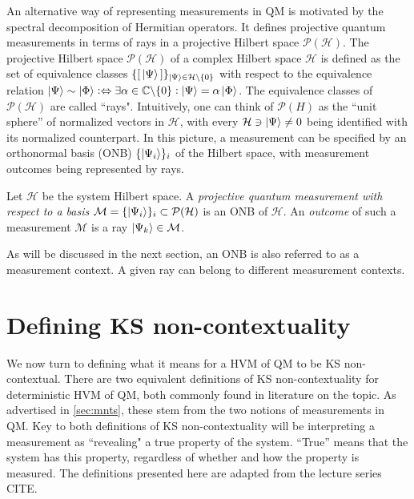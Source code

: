 An alternative way of representing measurements in QM is motivated by the spectral decomposition of Hermitian operators. It defines projective quantum measurements in terms of rays in a projective Hilbert space $\mathcal{P}(\mathcal{H})$. The projective Hilbert space $\mathcal{P}(\mathcal{H})$ of a complex Hilbert space $\mathcal{H}$ is defined as the set of equivalence classes $\{[\thinspace\ket{\Psi}\thinspace]\}_{\ket{\Psi} \in\mathcal{H}\backslash\{0\}}$ with respect to the equivalence relation $\ket{\Psi}\sim\ket{\Phi} \mathrel{\vcentcolon\Leftrightarrow}\exists\alpha\in\mathbb{C\backslash}\{0\}\vcentcolon\ket{\Psi} =\alpha\ket{\Phi}$. The equivalence classes of $\mathcal{P}(\mathcal{H})$ are called ``rays". Intuitively, one can think of $\mathcal{P}(H)$ as the ``unit sphere” of normalized vectors in $\mathcal{H}$, with every $\mathcal{H}\ni\ket{\Psi}\neq0$ being identified with its normalized counterpart. In this picture, a measurement can be specified by an orthonormal basis (ONB) $\{\ket{\Psi_{i}} \}_{i}$ of the Hilbert space, with measurement outcomes being represented by rays.

\begin{definition}
\label{def:projmntsbasis}
Let $\mathcal{H}$ be the system Hilbert space.\hfill\break
A \emph{projective quantum measurement with respect to a basis} $\mathcal{M}=\{\ket{\Psi_{i}} \}_{i}\subset\mathcal{\mathcal{P}}(\mathcal{H})$ is an ONB of $\mathcal{H}$. An \emph{outcome} of such a measurement $\mathcal{M}$ is a ray $\ket{\Psi_{k}} \in\mathcal{M}$.
\end{definition}

As will be discussed in the next section, an ONB is also referred to as a measurement context. A given ray can belong to different measurement contexts.

\section{Defining KS non-contextuality}
\label{sec:kscont}
We now turn to defining what it means for a HVM of QM to be KS non-contextual. There are two equivalent definitions of KS non-contextuality for deterministic HVM of QM, both commonly found in literature on the topic. As advertised in \ref{sec:mnts}, these stem from the two notions of measurements in QM. Key to both definitions of KS non-contextuality will be interpreting a measurement as ``revealing" a true property of the system. ``True” means that the system has this property, regardless of whether and how the property is measured. The definitions presented here are adapted from the lecture series CITE.

